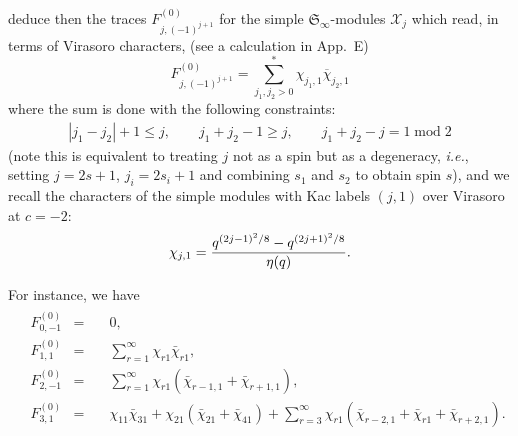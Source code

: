 \documentclass[11pt]{article}
\newcommand{\interLie}{\mathfrak{S}}
\newcommand{\interinfin}{\interLie_{\infty}}
\newcommand{\interM}[1]{\mathscr{X}_{#1}}
\newcommand{\AIrrTL}[2]{\mathscr{L}_{#1,#2}}
\newcommand{\AppChar}{E}
\theoremstyle{definition}
\begin{document}
deduce then the traces $F_{j,(-1)^{j+1}}^{(0)}$ for the simple $\interinfin$-modules
$\interM{j}$
which read, in terms of Virasoro characters,  (see a calculation in App.~\AppChar)
  \begin{equation}\label{Fs-Vir-content-gen}
  F_{j,(-1)^{j+1}}^{(0)}=\sum_{j_1,j_2> 0}^* \chi_{j_1,1}\overline{\chi}_{j_2,1}
  \end{equation}
  where the sum is done with the following constraints:
  \begin{eqnarray}\label{cond-sum-star}
  |j_1-j_2|+1\leq j,\qquad %
  j_1+j_2-1\geq j, \qquad %
  j_1+j_2 - j = 1\; \text{mod} \; 2
  \end{eqnarray}
 (note this is equivalent to treating $j$ not as a spin but as a degeneracy, {\it i.e.}, setting $j=2s+1$, $j_i=2s_i+1$ and combining $s_1$ and $s_2$ to obtain spin $s$), and we recall  the characters of the simple modules with Kac labels $(j,1)$ over Virasoro at $c=-2$:
%
\begin{equation}
\chi_{j,1}={q^{(2j-1)^2/8}-q^{(2j+1)^2/8}\over\eta(q)}.
\end{equation}

For instance, we have
 \begin{eqnarray}\label{Fs-Vir-content}
 \begin{split}
 &F_{0,-1}^{(0)}&=&\quad0,\\
  &F_{1,1}^{(0)}&=&\quad\sum_{r=1}^\infty \chi_{r1}\bar{\chi}_{r1},\\
   &F_{2,-1}^{(0)}&=&\quad\sum_{r=1}^\infty \chi_{r1}\left(\bar{\chi}_{r-1,1}+
   \bar{\chi}_{r+1,1}\right),\\
  &F_{3,1}^{(0)}&=&\quad\chi_{11}\bar{\chi}_{31} + \chi_{21}\left(\bar{\chi}_{21}+\bar{\chi}_{41}\right)
  +\sum_{r=3}^\infty \chi_{r1}\left(\bar{\chi}_{r-2,1}+\bar{\chi}_{r1}+
   \bar{\chi}_{r+2,1}\right).
   \end{split}
   \end{eqnarray}
\end{document}
